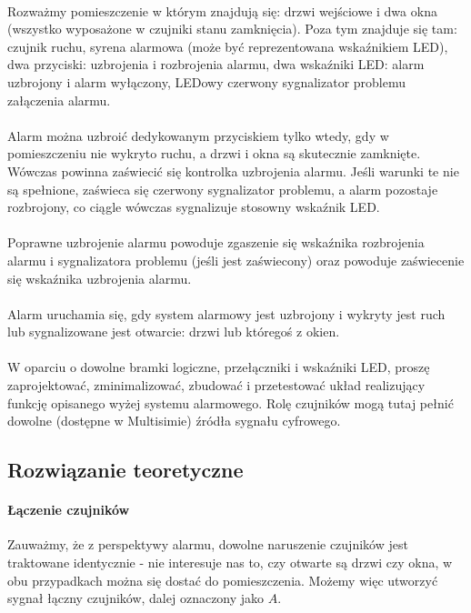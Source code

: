 \documentclass{article}
\begin{document}
\paragraph{}
Rozważmy pomieszczenie w którym znajdują się: drzwi wejściowe i dwa okna (wszystko wyposażone w czujniki stanu zamknięcia). Poza tym znajduje się tam: czujnik ruchu, syrena alarmowa (może być reprezentowana wskaźnikiem LED), dwa przyciski: uzbrojenia i rozbrojenia alarmu, dwa wskaźniki LED: alarm uzbrojony i alarm wyłączony, LEDowy czerwony sygnalizator problemu załączenia alarmu.
\paragraph{}
Alarm można uzbroić dedykowanym przyciskiem tylko wtedy, gdy w pomieszczeniu nie wykryto ruchu, a drzwi i okna są skutecznie zamknięte. Wówczas powinna zaświecić się kontrolka uzbrojenia alarmu. Jeśli warunki te nie są spełnione, zaświeca się czerwony sygnalizator problemu, a alarm pozostaje rozbrojony, co ciągle wówczas sygnalizuje stosowny wskaźnik LED.
\paragraph{}
Poprawne uzbrojenie alarmu powoduje zgaszenie się wskaźnika rozbrojenia alarmu i sygnalizatora problemu (jeśli jest zaświecony) oraz powoduje zaświecenie się wskaźnika uzbrojenia alarmu.
\paragraph{}
Alarm uruchamia się, gdy system alarmowy jest uzbrojony i wykryty jest ruch lub sygnalizowane jest otwarcie: drzwi lub któregoś z okien.
\paragraph{}
W oparciu o dowolne bramki logiczne, przełączniki i wskaźniki LED, proszę zaprojektować, zminimalizować, zbudować i przetestować układ realizujący funkcję opisanego wyżej systemu alarmowego. Rolę czujników mogą tutaj pełnić dowolne (dostępne w Multisimie) źródła sygnału cyfrowego.
\subsection{Rozwiązanie teoretyczne}
\paragraph{Łączenie czujników}
Zauważmy, że z perspektywy alarmu, dowolne naruszenie czujników jest traktowane identycznie - nie interesuje nas to, czy otwarte są drzwi czy okna, w obu przypadkach można się dostać do pomieszczenia. Możemy więc utworzyć sygnał łączny czujników, dalej oznaczony jako $A$.
\end{document}
